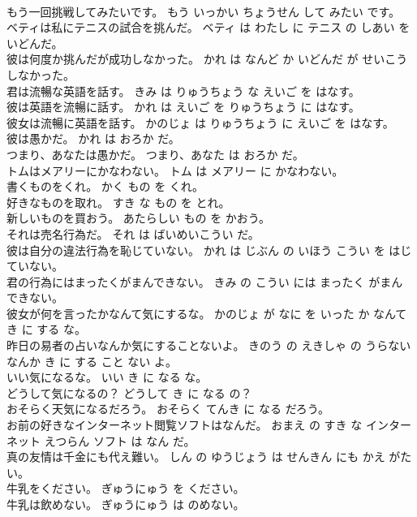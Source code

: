 \documentclass[8pt]{extreport}
\begin{document}
\begin{CJK}{UTF8}{min}
\\	もう一回挑戦してみたいです。	もう いっかい ちょうせん して みたい です。	
\\	ベティは私にテニスの試合を挑んだ。	ベティ は わたし に テニス の しあい を いどんだ。	
\\	彼は何度か挑んだが成功しなかった。	かれ は なんど か いどんだ が せいこう しなかった。	
\\	君は流暢な英語を話す。	きみ は りゅうちょう な えいご を はなす。	
\\	彼は英語を流暢に話す。	かれ は えいご を りゅうちょう に はなす。	
\\	彼女は流暢に英語を話す。	かのじょ は りゅうちょう に えいご を はなす。	
\\	彼は愚かだ。	かれ は おろか だ。	
\\	つまり、あなたは愚かだ。	つまり、あなた は おろか だ。	
\\	トムはメアリーにかなわない。	トム は メアリー に かなわない。	
\\	書くものをくれ。	かく もの を くれ。	
\\	好きなものを取れ。	すき な もの を とれ。	
\\	新しいものを買おう。	あたらしい もの を かおう。	
\\	それは売名行為だ。	それ は ばいめいこうい だ。	
\\	彼は自分の違法行為を恥じていない。	かれ は じぶん の いほう こうい を はじていない。	
\\	君の行為にはまったくがまんできない。	きみ の こうい には まったく がまん できない。	
\\	彼女が何を言ったかなんて気にするな。	かのじょ が なに を いった か なんて き に する な。	
\\	昨日の易者の占いなんか気にすることないよ。	きのう の えきしゃ の うらない なんか き に する こと ない よ。	
\\	いい気になるな。	いい き に なる な。	
\\	どうして気になるの？	どうして き に なる の？	
\\	おそらく天気になるだろう。	おそらく てんき に なる だろう。	
\\	お前の好きなインターネット閲覧ソフトはなんだ。	おまえ の すき な インターネット えつらん ソフト は なん だ。	
\\	真の友情は千金にも代え難い。	しん の ゆうじょう は せんきん にも かえ がたい。	
\\	牛乳をください。	ぎゅうにゅう を ください。	
\\	牛乳は飲めない。	ぎゅうにゅう は のめない。	

\end{CJK}
\end{document}
